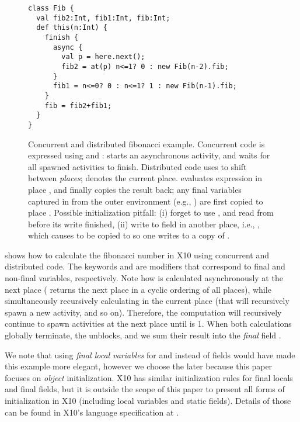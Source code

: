 \begin{figure}
\vspace{-0.2cm}\begin{lstlisting}
class Fib {
  val fib2:Int, fib1:Int, fib:Int;
  def this(n:Int) {
    finish {
      async {
        val p = here.next();
        fib2 = at(p) n<=1? 0 : new Fib(n-2).fib;
      }
      fib1 = n<=0? 0 : n<=1? 1 : new Fib(n-1).fib;
    }
    fib = fib2+fib1;
  }
}
\end{lstlisting}\vspace{-0.2cm}
\caption{Concurrent and distributed fibonacci example.
    Concurrent code is expressed using  and :
         starts an asynchronous activity,
        and  waits for all spawned activities to finish.
    Distributed code uses  to shift between
        \emph{places};
         denotes the current place.
     evaluates expression 
        in place , and finally copies the result back;
        any final variables captured in  from
        the outer environment (e.g., )
        are first copied to place .
    Possible initialization pitfall:
        (i) %
            forget to use ,
            and read from  before its write finished,
        (ii) %
            write to field  in another place, i.e.,
            ,
            which causes \this to be copied to 
            so one writes to a copy of \this.
    }
\label{Figure:DistributedFib}
\end{figure}

 shows how to calculate the fibonacci number  in X10
    using concurrent and distributed code.
The keywords  and  are modifiers that correspond to final and non-final variables, respectively.
Note how  is calculated asynchronously at the next place ( returns the next place in a cyclic ordering of all places),
    while simultaneously recursively calculating  in the current place (that will recursively spawn a new activity, and so on).
Therefore, the computation will recursively continue to spawn activities at the next place until  is 1.
When both calculations globally terminate, the  unblocks,
    and we sum their result into the \emph{final} field .

We note that using \emph{final local variables} for  and  instead of fields
    would have made this example
    more elegant, however we choose the later because this paper focuses on \emph{object} initialization.
X10 has similar initialization rules for final locals and final fields,
    but it is outside the scope of this paper to present all forms of initialization in X10
    (including local variables and static fields).
Details of those can be found in X10's language specification at .

